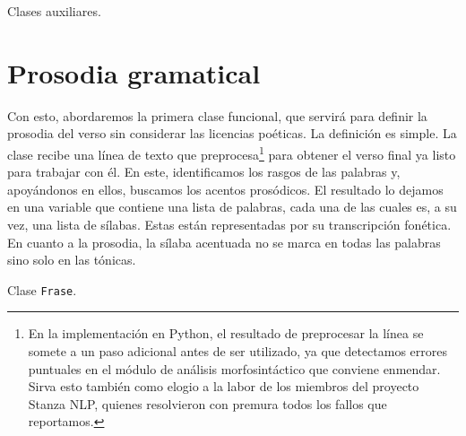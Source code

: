 \begin{algorithm}[!ht]
	\caption{Clases auxiliares.}\label{list:clasesauxiliares}
	\Fclase{\Valores{}}{
		\text \is \cadena \;
		\pos \is \cadena \;
		\phon \is \lista \;
		\feats \is \diccionario \;
		\dep \is \lista \;
		\ton \is \booleano
	}
	\;
	\Fclase{\Verso{}}{
		\slbs \is \lista \;
		\amb \is \entero \;
		\recuento \is \entero \;
		\asson \is \cadena \;
		\conss \is \cadena
	}
\end{algorithm}

\section{Prosodia gramatical}
Con esto, abordaremos la primera clase funcional, que servirá para definir la prosodia del verso sin considerar las licencias poéticas. La definición es simple. La clase \Frase recibe una línea de texto que preprocesa\footnote{En la implementación en Python, el resultado de preprocesar la línea se somete a un paso adicional antes de ser utilizado, ya que detectamos errores puntuales en el módulo de análisis morfosintáctico que conviene enmendar. Sirva esto también como elogio a la labor de los miembros del proyecto Stanza NLP, quienes resolvieron con premura todos los fallos que reportamos.} para obtener el verso final ya listo para trabajar con él. En este, identificamos los rasgos de las palabras y, apoyándonos en ellos, buscamos los acentos prosódicos. El resultado lo dejamos en una variable que contiene una lista de palabras, cada una de las cuales es, a su vez, una lista de sílabas. Estas están representadas por su transcripción fonética. En cuanto a la prosodia, la sílaba acentuada no se marca en todas las palabras sino solo en las tónicas.

\begin{algorithm}[!ht] %
	\caption{Clase \texttt{Frase}.}\label{list:playline}
\end{algorithm}

